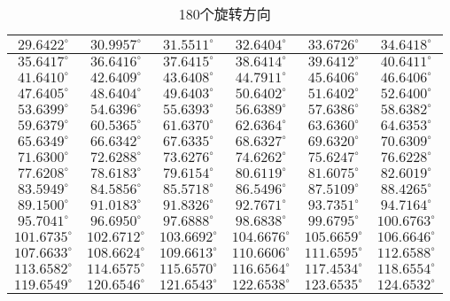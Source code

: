 \begin{longtable}{@{}cccccc@{}}
\caption{180个旋转方向}
\label{table:roration_degrees}
\endfirsthead
\endhead
\hline
$29.6422^\circ$ & $30.9957^\circ$ & $31.5511^\circ$ & $32.6404^\circ$ & $33.6726^\circ$ & $34.6418^\circ$\\ \hline
$35.6417^\circ$ & $36.6416^\circ$ & $37.6415^\circ$ & $38.6414^\circ$ & $39.6412^\circ$ & $40.6411^\circ$\\ \hline
$41.6410^\circ$ & $42.6409^\circ$ & $43.6408^\circ$ & $44.7911^\circ$ & $45.6406^\circ$ & $46.6406^\circ$\\ \hline
$47.6405^\circ$ & $48.6404^\circ$ & $49.6403^\circ$ & $50.6402^\circ$ & $51.6402^\circ$ & $52.6400^\circ$\\ \hline
$53.6399^\circ$ & $54.6396^\circ$ & $55.6393^\circ$ & $56.6389^\circ$ & $57.6386^\circ$ & $58.6382^\circ$\\ \hline
$59.6379^\circ$ & $60.5365^\circ$ & $61.6370^\circ$ & $62.6364^\circ$ & $63.6360^\circ$ & $64.6353^\circ$\\ \hline
$65.6349^\circ$ & $66.6342^\circ$ & $67.6335^\circ$ & $68.6327^\circ$ & $69.6320^\circ$ & $70.6309^\circ$\\ \hline
$71.6300^\circ$ & $72.6288^\circ$ & $73.6276^\circ$ & $74.6262^\circ$ & $75.6247^\circ$ & $76.6228^\circ$\\ \hline
$77.6208^\circ$ & $78.6183^\circ$ & $79.6154^\circ$ & $80.6119^\circ$ & $81.6075^\circ$ & $82.6019^\circ$\\ \hline
$83.5949^\circ$ & $84.5856^\circ$ & $85.5718^\circ$ & $86.5496^\circ$ & $87.5109^\circ$ & $88.4265^\circ$\\ \hline
$89.1500^\circ$ & $91.0183^\circ$ & $91.8326^\circ$ & $92.7671^\circ$ & $93.7351^\circ$ & $94.7164^\circ$\\ \hline
$95.7041^\circ$ & $96.6950^\circ$ & $97.6888^\circ$ & $98.6838^\circ$ & $99.6795^\circ$ & $100.6763^\circ$\\ \hline
$101.6735^\circ$ & $102.6712^\circ$ & $103.6692^\circ$ & $104.6676^\circ$ & $105.6659^\circ$ & $106.6646^\circ$\\ \hline
$107.6633^\circ$ & $108.6624^\circ$ & $109.6613^\circ$ & $110.6606^\circ$ & $111.6595^\circ$ & $112.6588^\circ$\\ \hline
$113.6582^\circ$ & $114.6575^\circ$ & $115.6570^\circ$ & $116.6564^\circ$ & $117.4534^\circ$ & $118.6554^\circ$\\ \hline
$119.6549^\circ$ & $120.6546^\circ$ & $121.6543^\circ$ & $122.6538^\circ$ & $123.6535^\circ$ & $124.6532^\circ$\\ \hline

\end{longtable}
